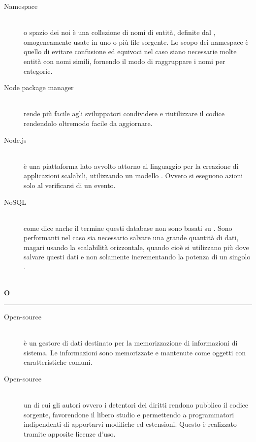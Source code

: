 \documentclass[12pt,a4paper]{article}
\begin{document}
\begin{description}

\item[Namespace] 
\hfill\\ o spazio dei noi è una collezione di nomi di entità, definite dal , omogeneamente usate in uno o più file sorgente. Lo scopo dei namespace è quello di evitare confusione ed equivoci nel caso siano necessarie molte entità con nomi simili, fornendo il modo di raggruppare i nomi per categorie.

\item[Node package manager] 
\hfill\\ rende più facile agli sviluppatori  condividere e riutilizzare il codice rendendolo oltremodo facile da aggiornare.

\item[Node.js] 
\hfill\\ è una piattaforma lato  avvolto attorno al linguaggio  per la creazione di applicazioni scalabili, utilizzando un modello . Ovvero si eseguono azioni solo al verificarsi di un evento.

\item[NoSQL] 
\hfill\\ come dice anche il termine questi database non sono basati su . Sono performanti nel caso sia necessario salvare una grande quantità di dati, magari usando la scalabilità orizzontale, quando cioè si utilizzano più  dove salvare questi dati e non solamente incrementando la potenza di un singolo .
\end{description}

\newpage

\begin{center}
\hfill\\
	\LARGE \textbf{O}
\hfill\\
\rule[15pt]{30pt}{0.5pt}
\end{center}

\begin{description}

\item[Open-source] 
\hfill\\è un gestore di dati destinato per la memorizzazione di informazioni di sistema. Le informazioni sono memorizzate e mantenute come oggetti con caratteristiche comuni.

\item[Open-source] 
\hfill\\ un  di cui gli autori ovvero i detentori dei diritti rendono pubblico il codice sorgente, favorendone il libero studio e permettendo a programmatori indipendenti di apportarvi modifiche ed estensioni. Questo è realizzato tramite apposite licenze d'uso.
\end{description}
\end{document}
